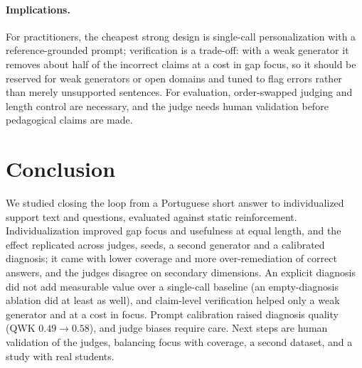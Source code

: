 \documentclass[11pt]{article}
\begin{document}
\paragraph{Implications.} For practitioners, the cheapest strong design is single-call personalization with a reference-grounded prompt; verification is a trade-off: with a weak generator it removes about half of the incorrect claims at a cost in gap focus, so it should be reserved for weak generators or open domains and tuned to flag errors rather than merely unsupported sentences. For evaluation, order-swapped judging and length control are necessary, and the judge needs human validation before pedagogical claims are made.

\section{Conclusion}
We studied closing the loop from a Portuguese short answer to individualized support text and questions, evaluated against static reinforcement. Individualization improved gap focus and usefulness at equal length, and the effect replicated across judges, seeds, a second generator and a calibrated diagnosis; it came with lower coverage and more over-remediation of correct answers, and the judges disagree on secondary dimensions. An explicit diagnosis did not add measurable value over a single-call baseline (an empty-diagnosis ablation did at least as well), and claim-level verification helped only a weak generator and at a cost in focus. Prompt calibration raised diagnosis quality (QWK $0.49 \to 0.58$), and judge biases require care. Next steps are human validation of the judges, balancing focus with coverage, a second dataset, and a study with real students.

\end{document}
